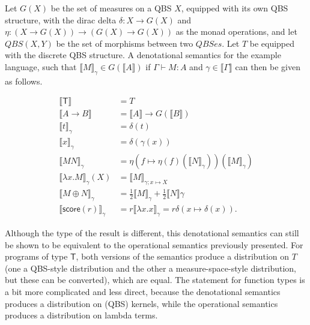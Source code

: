\documentclass[titlepage]{article}
\newcommand{\tscore}{\mathsf{score}}
\newcommand{\denotation}[1]{\llbracket #1 \rrbracket}
\begin{document}
Let $G(X)$ be the set of measures on a QBS $X$, equipped with its own QBS structure, with the dirac delta $\delta : X \to G(X)$ and $\eta : (X \to G(X)) \to (G(X) \to G(X))$ as the monad operations, and let $QBS(X, Y)$ be the set of morphisms between two $QBSes$. Let $T$ be equipped with the discrete QBS structure. A denotational semantics for the example language, such that $\denotation M_\gamma \in G(\denotation A)$ if $\Gamma \vdash M : A$ and $\gamma \in \denotation \Gamma$ can then be given as follows.

\begin{align*}
\denotation{\mathsf T} & = T \\
\denotation{A \to B} & = \denotation A \to G(\denotation B) \\
\denotation{t}_\gamma & = \delta(t) \\
\denotation{x}_\gamma & = \delta(\gamma(x)) \\
\denotation{M N}_\gamma & = \eta(f \mapsto \eta(f)(\denotation N_\gamma))(\denotation M_\gamma) \\
\denotation{\lambda x. M}_\gamma(X) & = \denotation M_{\gamma ; x \mapsto X} \\
\denotation{M \oplus N}_\gamma & = \frac 1 2 \denotation M_\gamma + \frac 1 2 \denotation N \gamma \\
\denotation{\tscore(r)}_\gamma & = r \denotation{\lambda x. x}_\gamma = r \delta(x \mapsto \delta(x)).
\end{align*}

Although the type of the result is different, this denotational semantics can still be shown to be equivalent to the operational semantics previously presented. For programs of type $\mathsf T$, both versions of the semantics produce a distribution on $T$ (one a QBS-style distribution and the other a measure-space-style distribution, but these can be converted), which are equal. The statement for function types is a bit more complicated and less direct, because the denotational semantics produces a distribution on (QBS) kernels, while the operational semantics produces a distribution on lambda terms.
\end{document}
